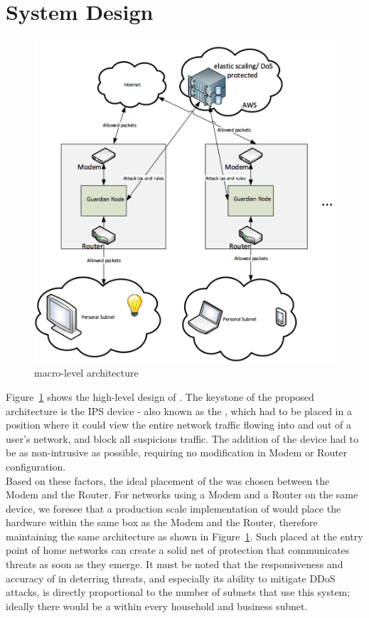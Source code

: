 \section{System Design}

\begin{figure}
    \centering
    \includegraphics[width=0.95\linewidth]{figs/macro.png}
    \caption{\sysname macro-level architecture}
    \label{fig:macro}
\end{figure}


\label{sec:design}

Figure~\ref{fig:macro} shows the high-level design of \sysname. The keystone of the proposed architecture is the \sysname IPS device - also known as the \nodename, which had to be placed in a position where it could view the entire network traffic flowing into and out of a user's network, and block all suspicious traffic. The addition of the device had to be as non-intrusive as possible, requiring no modification in Modem or Router configuration. \\

Based on these factors, the ideal placement of the \nodename was chosen between the Modem and the Router. For networks using a Modem and a Router on the same device, we foresee that a production scale implementation of \sysname would place the \nodename hardware within the same box as the Modem and the Router, therefore maintaining the same architecture as shown in Figure~\ref{fig:macro}. Such \nodenames placed at the entry point of home networks can create a solid net of protection that communicates threats as soon as they emerge. It must be noted that the responsiveness and accuracy of \sysname in deterring threats, and especially its ability to mitigate DDoS attacks, is directly proportional to the number of subnets that use this system; ideally there would be a \nodename within every household and business subnet.

